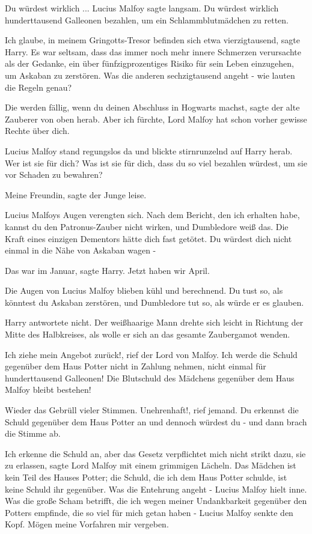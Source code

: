 \glqq{}Du würdest wirklich ...\grqq{} Lucius Malfoy sagte langsam. \glqq{}Du
würdest wirklich hunderttausend Galleonen bezahlen, um ein Schlammblutmädchen zu
retten.\grqq{}

\glqq{}Ich glaube, in meinem Gringotts-Tresor befinden sich etwa
vierzigtausend\grqq{}, sagte Harry. Es war seltsam, dass das immer noch mehr
innere Schmerzen verursachte als der Gedanke, ein über fünfzigprozentiges Risiko
für sein Leben einzugehen, um Askaban zu zerstören. \glqq{}Was die anderen
sechzigtausend angeht - wie lauten die Regeln genau?\grqq{}

\glqq{}Die werden fällig, wenn du deinen Abschluss in Hogwarts machst\grqq{},
sagte der alte Zauberer von oben herab. \glqq{}Aber ich fürchte, Lord Malfoy hat
schon vorher gewisse Rechte über dich.\grqq{}

Lucius Malfoy stand regungslos da und blickte stirnrunzelnd auf Harry herab.
\glqq{}Wer ist sie für dich? Was ist sie für dich, dass du so viel bezahlen
würdest, um sie vor Schaden zu bewahren?\grqq{}

\glqq{}Meine Freundin\grqq{}, sagte der Junge leise.

Lucius Malfoys Augen verengten sich. \glqq{}Nach dem Bericht, den ich erhalten
habe, kannst du den Patronus-Zauber nicht wirken, und Dumbledore weiß das. Die
Kraft eines einzigen Dementors hätte dich fast getötet. Du würdest dich nicht
einmal in die Nähe von Askaban wagen -\grqq{}

\glqq{}Das war im Januar\grqq{}, sagte Harry. \glqq{}Jetzt haben wir April.\grqq{}

Die Augen von Lucius Malfoy blieben kühl und berechnend. \glqq{}Du tust so, als
könntest du Askaban zerstören, und Dumbledore tut so, als würde er es
glauben.\grqq{}

Harry antwortete nicht. Der weißhaarige Mann drehte sich leicht in Richtung der
Mitte des Halbkreises, als wolle er sich an das gesamte Zaubergamot wenden.

\glqq{}Ich ziehe mein Angebot zurück!\grqq{}, rief der Lord von Malfoy. \glqq{}Ich
werde die Schuld gegenüber dem Haus Potter nicht in Zahlung nehmen, nicht einmal
für hunderttausend Galleonen! Die Blutschuld des Mädchens gegenüber dem Haus
Malfoy bleibt bestehen!\grqq{}

Wieder das Gebrüll vieler Stimmen. \glqq{}Unehrenhaft!\grqq{}, rief jemand. \glqq{}
Du erkennst die Schuld gegenüber dem Haus Potter an und dennoch würdest du
-\grqq{} und dann brach die Stimme ab.

\glqq{}Ich erkenne die Schuld an, aber das Gesetz verpflichtet mich nicht strikt
dazu, sie zu erlassen\grqq{}, sagte Lord Malfoy mit einem grimmigen Lächeln.
\glqq{}Das Mädchen ist kein Teil des Hauses Potter; die Schuld, die ich dem Haus
Potter schulde, ist keine Schuld ihr gegenüber. Was die Entehrung angeht
-\grqq{} Lucius Malfoy hielt inne. \glqq{}Was die große Scham betrifft, die ich
wegen meiner Undankbarkeit gegenüber den Potters empfinde, die so viel für mich
getan haben -\grqq{} Lucius Malfoy senkte den Kopf. \glqq{}Mögen meine Vorfahren
mir vergeben.\grqq{}

